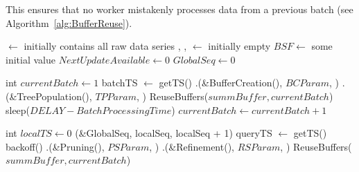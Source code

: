 {This ensures that no worker mistakenly processes data from a previous batch
(see Algorithm~\ref{alg:BufferReuse}).  


\begin{algorithm}[htbp]
    \footnotesize
    \vspace*{2mm}
    
    \begin{algorithmic}[1]
    
        \State \BC $\gets$ initially contains all raw data series
        \State \TP, \PS, \RS $\gets$ initially empty
        \State $\mathit{BSF} \gets$ some initial value
        \State $\mathit{NextUpdateAvailable} \gets 0$
        \State $\mathit{GlobalSeq} \gets 0$
    \EndProcedure
    
    \vspace*{1mm}
    \vspace*{1mm}
    
        \State int $\mathit{currentBatch} \gets 1$
                \State batchTS $\gets$ getTS()
            \EndIf
            \State \BC.\Traverse(\&BufferCreation(), $\mathit{BCParam}$, \False)
            \State \TP.\Traverse(\&TreePopulation(), $\mathit{TPParam}$, \False)
                \State ReuseBuffers($\mathit{summBuffer}, \mathit{currentBatch}$)
            \EndFor
                \State sleep($\mathit{DELAY}-\mathit{BatchProcessingTime}$)
            \EndIf
            \State $\mathit{currentBatch} \gets \mathit{currentBatch} + 1$
        \EndWhile
    \EndProcedure
    
    \vspace*{1mm}
    \vspace*{1mm}
    
        \State int $\mathit{localTS} \gets 0$
                    \State \CAS(\&GlobalSeq, localSeq, localSeq + 1)
                \EndIf
                \State queryTS $\gets$ getTS()
                    \State backoff()
                \EndWhile
            \EndIf
            \State \PS.\Traverse(\&Pruning(), $\mathit{PSParam}$, \False)
            \State \TP.\Traverse(\&Refinement(), $\mathit{RSParam}$, \False)
                \State ReuseBuffers($\mathit{summBuffer}, \mathit{currentBatch}$)
            \EndFor
            

\end{algorithmic}
\end{algorithm}}
